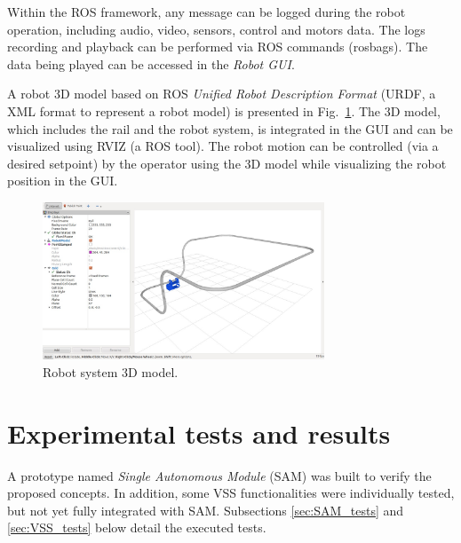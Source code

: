 \documentclass{ifacconf}
\begin{document}
Within the ROS framework, any message can be logged during the robot
operation, including audio, video, sensors, control and motors data. The logs
recording and playback can be performed via ROS commands (rosbags). The data
being played can be accessed in the \emph{Robot GUI}.

A robot 3D model based on ROS \emph{Unified Robot Description Format} (URDF, a
XML format to represent a robot model) is presented in Fig.~\ref{fig:rviz}. The
3D model, which includes the rail and the robot system, is integrated in the GUI and can be visualized using RVIZ (a ROS tool).
The robot motion can be controlled (via a desired setpoint) by the operator
using the 3D model while visualizing the robot position in the GUI.
 
\begin{figure} 
\centering
\includegraphics[width=8.4cm]{figs/rviz.jpg}
\caption{Robot system 3D model.}
\label{fig:rviz}
\end{figure}




\section{Experimental tests and results}\label{sec:results}
A prototype named \emph{Single Autonomous Module} (SAM) was built to verify the
proposed concepts. In addition, some VSS functionalities were individually
tested, but not yet fully integrated with SAM. Subsections \ref{sec:SAM_tests}
and \ref{sec:VSS_tests} below detail the executed tests.
\end{document}
